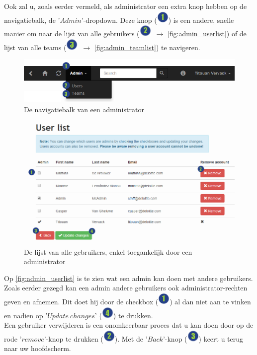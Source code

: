 \documentclass[a4paper,11pt]{article}
\newcommand{\one}{\includegraphics[scale=0.5]{Gebruikershandleiding_img/1.png}}
\newcommand{\two}{\includegraphics[scale=0.5]{Gebruikershandleiding_img/2.png}}
\newcommand{\three}{\includegraphics[scale=0.5]{Gebruikershandleiding_img/3.png}}
\newcommand{\four}{\includegraphics[scale=0.5]{Gebruikershandleiding_img/4.png}}
\begin{document}
Ook zal u, zoals eerder vermeld, als administrator een extra knop hebben op de navigatiebalk, de '$Admin$'-dropdown. Deze knop (\one) is een andere, snelle manier om naar de lijst van alle gebruikers (\two\ $\rightarrow$ \autoref{fig:admin_userlist}) of de lijst van alle teams (\three\ $\rightarrow$ \autoref{fig:admin_teamlist}) te navigeren.

\begin{figure}[H]
\centering
\includegraphics[scale=0.5]{Gebruikershandleiding_img/admin_navbar.png}
\caption{De navigatiebalk van een administrator}
\label{fig:admin_navbar}
\end{figure}

\begin{figure}[H]
\centering
\includegraphics[scale=0.5]{Gebruikershandleiding_img/admin_user.png}
\caption{De lijst van alle gebruikers, enkel toegankelijk door een administrator}
\label{fig:admin_userlist}
\end{figure}
Op \autoref{fig:admin_userlist} is te zien wat een admin kan doen met andere gebruikers. Zoals eerder gezegd kan een admin andere gebruikers ook administrator-rechten geven en afnemen. Dit doet hij door de checkbox (\one) al dan niet aan te vinken en nadien op '$Update\ changes$' (\four) te drukken.\\
Een gebruiker verwijderen is een onomkeerbaar proces dat u kan doen door op de rode '$remove$'-knop te drukken (\two). Met de '$Back$'-knop (\three) keert u terug naar uw hoofdscherm.
\end{document}
